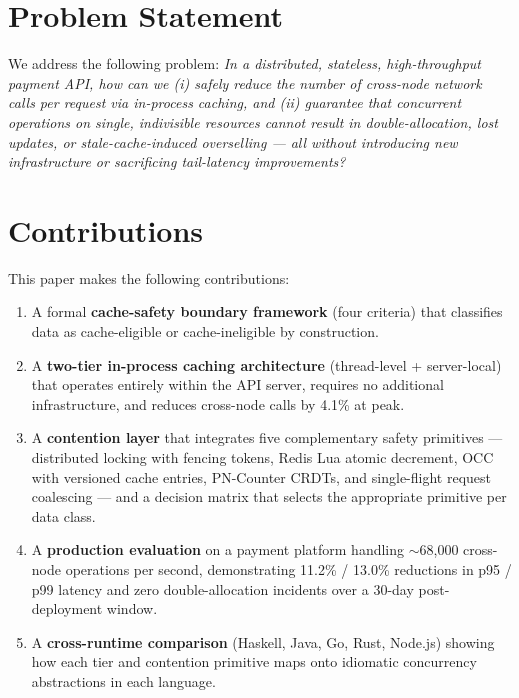 \section{Problem Statement}
We address the following problem: \emph{In a distributed, stateless, high-throughput payment API, how can we (i) safely reduce the number of cross-node network calls per request via in-process caching, and (ii) guarantee that concurrent operations on single, indivisible resources cannot result in double-allocation, lost updates, or stale-cache-induced overselling --- all without introducing new infrastructure or sacrificing tail-latency improvements?}

\section{Contributions}
This paper makes the following contributions:
\begin{enumerate}[leftmargin=*]
    \item A formal \textbf{cache-safety boundary framework} (four criteria) that classifies data as cache-eligible or cache-ineligible by construction.
    \item A \textbf{two-tier in-process caching architecture} (thread-level + server-local) that operates entirely within the API server, requires no additional infrastructure, and reduces cross-node calls by 4.1\% at peak.
    \item A \textbf{contention layer} that integrates five complementary safety primitives --- distributed locking with fencing tokens, Redis Lua atomic decrement, OCC with versioned cache entries, PN-Counter CRDTs, and single-flight request coalescing --- and a decision matrix that selects the appropriate primitive per data class.
    \item A \textbf{production evaluation} on a payment platform handling $\sim$68{,}000 cross-node operations per second, demonstrating 11.2\% / 13.0\% reductions in p95 / p99 latency and zero double-allocation incidents over a 30-day post-deployment window.
    \item A \textbf{cross-runtime comparison} (Haskell, Java, Go, Rust, Node.js) showing how each tier and contention primitive maps onto idiomatic concurrency abstractions in each language.
\end{enumerate}

